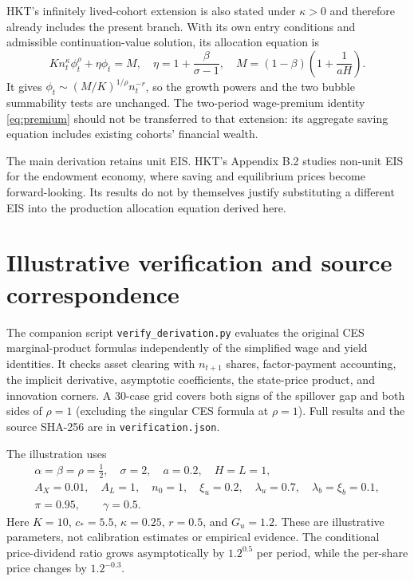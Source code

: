 \documentclass[11pt,a4paper]{article}
\newcommand{\asym}{\sim}
\begin{document}
HKT's infinitely lived-cohort extension is also stated under $\kappa>0$ and
therefore already includes the present branch. With its own entry conditions
and admissible continuation-value solution, its allocation equation is
\begin{equation}
Kn_t^\kappa\phi_t^\rho+\eta\phi_t=M,
\quad \eta=1+\frac{\beta}{\sigma-1},\quad
M=(1-\beta)\left(1+\frac1{aH}\right).
\end{equation}
It gives $\phi_t\asym(M/K)^{1/\rho}n_t^{-r}$, so the growth powers and the
two bubble summability tests are unchanged. The two-period wage-premium
identity \eqref{eq:premium} should not be transferred to that extension:
its aggregate saving equation includes existing cohorts' financial wealth.

The main derivation retains unit EIS. HKT's Appendix B.2 studies non-unit EIS
for the endowment economy, where saving and equilibrium prices become
forward-looking. Its results do not by themselves justify substituting a
different EIS into the production allocation equation derived here.

\section{Illustrative verification and source correspondence}
The companion script \texttt{verify\_derivation.py} evaluates the original CES
marginal-product formulas independently of the simplified wage and yield
identities. It checks asset clearing with $n_{t+1}$ shares, factor-payment
accounting, the implicit derivative, asymptotic coefficients, the state-price
product, and innovation corners. A 30-case grid covers both signs of the
spillover gap and both sides of $\rho=1$ (excluding the singular CES formula
at $\rho=1$). Full results and the source SHA-256 are in
\texttt{verification.json}.

The illustration uses
\begin{gather*}
\alpha=\beta=\rho=\tfrac12,\quad \sigma=2,\quad a=0.2,\quad H=L=1,\\
A_X=0.01,\quad A_L=1,\quad n_0=1,\quad
\xi_u=0.2,\quad\lambda_u=0.7,\quad\lambda_b=\xi_b=0.1,\\
\pi=0.95,\qquad\gamma=0.5.
\end{gather*}
Here $K=10$, $c_*=5.5$, $\kappa=0.25$, $r=0.5$, and $G_u=1.2$.
These are illustrative parameters, not calibration estimates or empirical
evidence. The conditional price-dividend ratio grows asymptotically by
$1.2^{0.5}$ per period, while the per-share price changes by $1.2^{-0.3}$.
\end{document}
